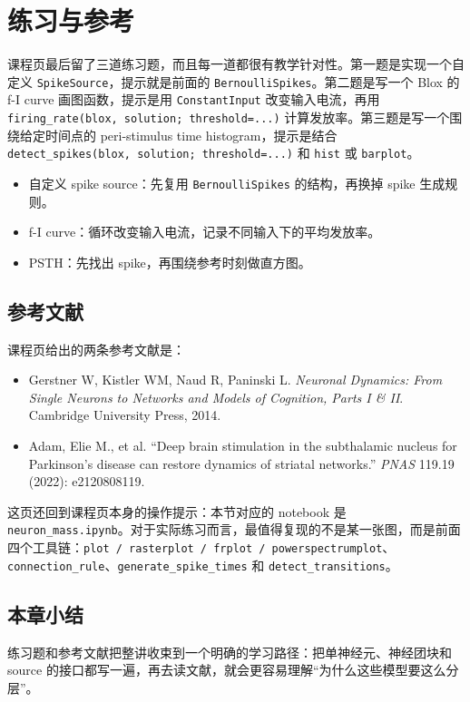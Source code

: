 \documentclass[a4paper]{article}
\begin{document}
\section{练习与参考}
课程页最后留了三道练习题，而且每一道都很有教学针对性。第一题是实现一个自定义 \texttt{SpikeSource}，提示就是前面的 \texttt{BernoulliSpikes}。第二题是写一个 Blox 的 f-I curve 画图函数，提示是用 \texttt{ConstantInput} 改变输入电流，再用 \texttt{firing\_rate(blox, solution; threshold=...)} 计算发放率。第三题是写一个围绕给定时间点的 peri-stimulus time histogram，提示是结合 \texttt{detect\_spikes(blox, solution; threshold=...)} 和 \texttt{hist} 或 \texttt{barplot}。

\begin{itemize}
  \item 自定义 spike source：先复用 \texttt{BernoulliSpikes} 的结构，再换掉 spike 生成规则。
  \item f-I curve：循环改变输入电流，记录不同输入下的平均发放率。
  \item PSTH：先找出 spike，再围绕参考时刻做直方图。
\end{itemize}

\subsection{参考文献}
课程页给出的两条参考文献是：
\begin{itemize}
  \item Gerstner W, Kistler WM, Naud R, Paninski L. \emph{Neuronal Dynamics: From Single Neurons to Networks and Models of Cognition, Parts I \& II}. Cambridge University Press, 2014.
  \item Adam, Elie M., et al. “Deep brain stimulation in the subthalamic nucleus for Parkinson's disease can restore dynamics of striatal networks.” \emph{PNAS} 119.19 (2022): e2120808119.
\end{itemize}

这页还回到课程页本身的操作提示：本节对应的 notebook 是 \texttt{neuron\_mass.ipynb}。对于实际练习而言，最值得复现的不是某一张图，而是前面四个工具链：\texttt{plot / rasterplot / frplot / powerspectrumplot}、\texttt{connection\_rule}、\texttt{generate\_spike\_times} 和 \texttt{detect\_transitions}。

\subsection{本章小结}
练习题和参考文献把整讲收束到一个明确的学习路径：把单神经元、神经团块和 source 的接口都写一遍，再去读文献，就会更容易理解“为什么这些模型要这么分层”。
\end{document}
